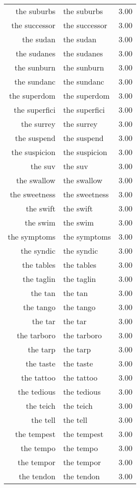 \begin{table}[ht]
\begin{tabular}{rlr}
  the suburbs & the suburbs & 3.00 \\ 
  the successor & the successor & 3.00 \\ 
  the sudan & the sudan & 3.00 \\ 
  the sudanes & the sudanes & 3.00 \\ 
  the sunburn & the sunburn & 3.00 \\ 
  the sundanc & the sundanc & 3.00 \\ 
  the superdom & the superdom & 3.00 \\ 
  the superfici & the superfici & 3.00 \\ 
  the surrey & the surrey & 3.00 \\ 
  the suspend & the suspend & 3.00 \\ 
  the suspicion & the suspicion & 3.00 \\ 
  the suv & the suv & 3.00 \\ 
  the swallow & the swallow & 3.00 \\ 
  the sweetness & the sweetness & 3.00 \\ 
  the swift & the swift & 3.00 \\ 
  the swim & the swim & 3.00 \\ 
  the symptoms & the symptoms & 3.00 \\ 
  the syndic & the syndic & 3.00 \\ 
  the tables & the tables & 3.00 \\ 
  the taglin & the taglin & 3.00 \\ 
  the tan & the tan & 3.00 \\ 
  the tango & the tango & 3.00 \\ 
  the tar & the tar & 3.00 \\ 
  the tarboro & the tarboro & 3.00 \\ 
  the tarp & the tarp & 3.00 \\ 
  the taste & the taste & 3.00 \\ 
  the tattoo & the tattoo & 3.00 \\ 
  the tedious & the tedious & 3.00 \\ 
  the teich & the teich & 3.00 \\ 
  the tell & the tell & 3.00 \\ 
  the tempest & the tempest & 3.00 \\ 
  the tempo & the tempo & 3.00 \\ 
  the tempor & the tempor & 3.00 \\ 
  the tendon & the tendon & 3.00 \\ 

\end{tabular}
\end{table}
